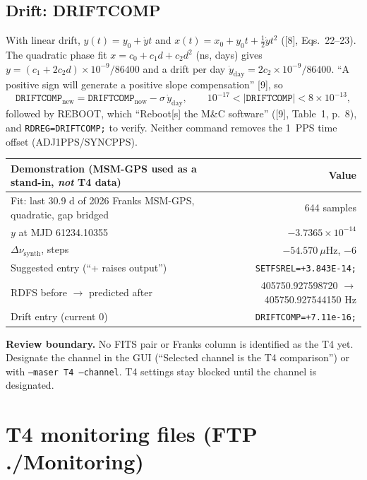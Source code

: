 \documentclass[11pt,a4paper]{article}
\newcommand{\tfourman}{[8]}
\newcommand{\tfournet}{[9]}
\newcommand{\warning}[1]{\par\noindent\colorbox{light}{\parbox{\dimexpr\linewidth-2\fboxsep}{\textbf{Review boundary.} #1}}\par}
\begin{document}
\subsection{Drift: DRIFTCOMP}
With linear drift, $y(t)=y_0+\dot y t$ and $x(t)=x_0+y_0t+\tfrac12\dot y t^2$ (\tfourman, Eqs.~22--23).
The quadratic phase fit $x=c_0+c_1d+c_2d^2$ (ns, days) gives
$y=(c_1+2c_2d)\times10^{-9}/86400$ and a drift per day
$\dot y_{\mathrm{day}}=2c_2\times10^{-9}/86400$. ``A positive sign will generate a positive slope
compensation'' \tfournet, so
\[
\texttt{DRIFTCOMP}_{\mathrm{new}}=\texttt{DRIFTCOMP}_{\mathrm{now}}-\sigma\,\dot y_{\mathrm{day}},
\qquad 10^{-17}<|\texttt{DRIFTCOMP}|<8\times10^{-13},
\]
followed by REBOOT, which ``Reboot[s] the M\&C software'' (\tfournet, Table~1, p.~8), and
\texttt{RDREG=DRIFTCOMP;} to verify. Neither command
removes the 1~PPS time offset (ADJ1PPS/SYNCPPS).

\begin{center}
\small
\begin{tabular}{@{}lr@{}}
\toprule
Demonstration (MSM-GPS used as a stand-in, \emph{not} T4 data) & Value\\
\midrule
Fit: last 30.9 d of 2026 Franks MSM-GPS, quadratic, gap bridged & 644 samples\\
$y$ at MJD 61234.10355 & $-3.7365\times10^{-14}$\\
$\Delta\nu_{\mathrm{synth}}$, steps & $-54.570~\mu$Hz, $-6$\\
Suggested entry (``+ raises output'') & \texttt{SETFSREL=+3.843E-14;}\\
RDFS before $\rightarrow$ predicted after & 405750.927598720 $\rightarrow$ 405750.927544150 Hz\\
Drift entry (current 0) & \texttt{DRIFTCOMP=+7.11e-16;}\\
\bottomrule
\end{tabular}
\end{center}

\warning{No FITS pair or Franks column is identified as the T4 yet. Designate the channel
in the GUI (``Selected channel is the T4 comparison'') or with \texttt{--maser T4 --channel}.
T4 settings stay blocked until the channel is designated.}

\section{T4 monitoring files (FTP ./Monitoring)}
\end{document}
